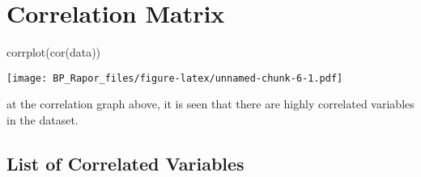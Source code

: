 \documentclass[12pt,twoside]{deuthesis}
\newenvironment{Shaded}{\begin{snugshade}}{\end{snugshade}}
\newcommand{\FunctionTok}[1]{\textcolor[rgb]{0.00,0.00,0.00}{#1}}
\newcommand{\NormalTok}[1]{#1}
\begin{document}
\hypertarget{correlation-matrix}{%
\section{Correlation Matrix}\label{correlation-matrix}}
\begin{Shaded}
\begin{Highlighting}[]
\FunctionTok{corrplot}\NormalTok{(}\FunctionTok{cor}\NormalTok{(data))}
\end{Highlighting}
\end{Shaded}
\texttt{[image: BP\_Rapor\_files/figure-latex/unnamed-chunk-6-1.pdf]}

at the correlation graph above, it is seen that there are highly correlated variables in the dataset.

\pagebreak

\hypertarget{list-of-correlated-variables}{%
\subsection{List of Correlated Variables}\label{list-of-correlated-variables}}
\end{document}
